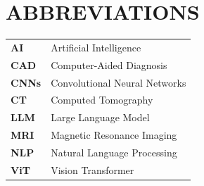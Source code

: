 \documentclass[a4paper,12pt]{report}
\begin{document}
\tableofcontents
\newpage

\listoffigures
\newpage
\chapter*{ABBREVIATIONS}
\vspace{0.5cm}
\begin{table}[H]
\renewcommand{\arraystretch}{1.5}
\begin{tabular}{p{3cm} l}
\textbf{AI} & Artificial Intelligence \\
\textbf{CAD} & Computer-Aided Diagnosis \\
\textbf{CNNs} & Convolutional Neural Networks \\
\textbf{CT} & Computed Tomography \\
\textbf{LLM} & Large Language Model \\
\textbf{MRI} & Magnetic Resonance Imaging \\
\textbf{NLP} & Natural Language Processing \\
\textbf{ViT} & Vision Transformer \\
\end{tabular}
\end{table}

\newpage
\vspace{0.5cm}
\end{document}
